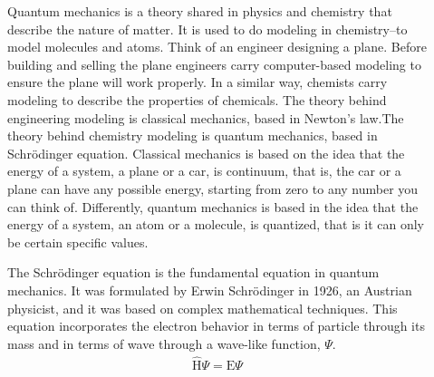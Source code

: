 \documentclass[main.tex]{subfiles}
\begin{document}
\sloppy
\begin{description}
\item[] 
Quantum mechanics is a theory shared in physics and chemistry that describe the nature of matter. It is used to do modeling in chemistry--to model molecules and atoms. Think of an engineer designing a plane. Before building and selling the plane engineers carry computer-based modeling to ensure the plane will work properly. In a similar way, chemists carry modeling to describe the properties of chemicals. The theory behind engineering modeling is classical mechanics, based in Newton's law.The theory behind chemistry modeling is quantum mechanics, based in Schr\"{o}dinger equation. Classical mechanics is based on the idea that the energy of a system, a plane or a car, is continuum, that is, the car or a plane can have any possible energy, starting from zero to any number you can think of. 
Differently, quantum mechanics is based in the idea that the energy of a system, an atom or a molecule, is quantized, that is it can only be certain specific values. 
 \item[] 
The Schr\"{o}dinger equation is the fundamental equation in quantum mechanics. It was formulated by Erwin Schr\"{o}dinger in 1926, an Austrian physicist, and it was based on complex mathematical techniques. This equation incorporates the electron behavior in terms of particle through its mass and in terms of wave through a wave-like function, $\Psi$.
 \begin{equation*}\begin{split}
\hat{\text{H}}\Psi=\text{E}\Psi

\end{split}
\end{equation*}
\end{description}
\end{document}
